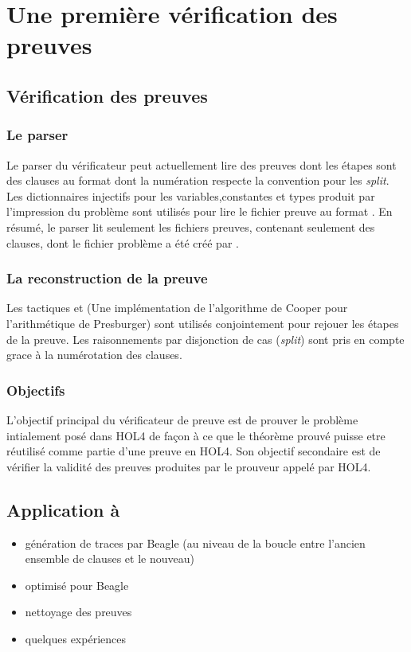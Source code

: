 \section{Une première vérification des preuves \tff}

\subsection{Vérification des preuves}

\subsubsection{Le parser}
Le parser du vérificateur peut actuellement lire des preuves dont les étapes sont des clauses au format \tff dont la numération respecte la convention \tff pour les \textit{split}. Les dictionnaires injectifs pour les variables,constantes et types produit par l'impression du problème sont utilisés pour lire le fichier preuve au format \tff. En résumé, le parser lit seulement les fichiers preuves, contenant seulement des clauses, dont le fichier problème a été créé par \holfour.

\subsubsection{La reconstruction de la preuve}
Les tactiques \metistac et \coopertac (Une implémentation de l'algorithme de Cooper pour l'arithmétique de Presburger)
sont utilisés conjointement pour rejouer les étapes de la preuve. 
Les raisonnements par disjonction de cas (\textit{split}) sont pris en compte grace à la numérotation des clauses.

\subsubsection{Objectifs}
L'objectif principal du vérificateur de preuve est de prouver le problème intialement posé dans HOL4 de façon à ce que le théorème prouvé puisse etre réutilisé comme partie d'une preuve en HOL4. Son objectif secondaire est de vérifier la validité des preuves produites par le prouveur appelé par HOL4.

\subsection{Application à \beagle}
\begin{itemize}
\item génération de traces par Beagle (au niveau de la boucle entre
  l'ancien ensemble de clauses et le nouveau)
\item optimisé pour Beagle
\item nettoyage des preuves
\item quelques expériences
\end{itemize}

